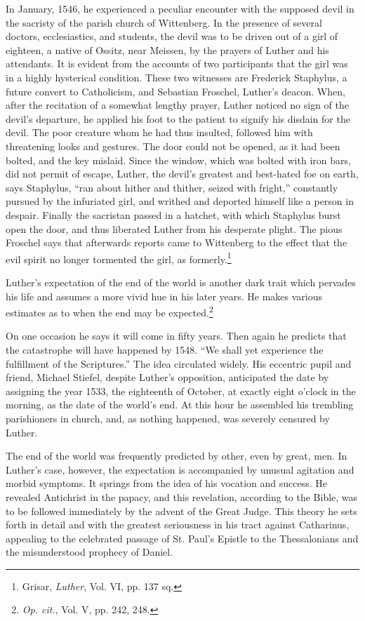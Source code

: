 In January, 1546, he experienced a peculiar encounter with the supposed
devil in the sacristy of the parish church of Wittenberg. In the presence of
several doctors, ecclesiastics, and students, the devil was to be driven out of
a girl of eighteen, a native of Ossitz, near Meissen, by the prayers of Luther
and his attendants. It is evident from the accounts of two participants that
the girl was in a highly hysterical condition. These two witnesses are
Frederick Staphylus, a future convert to Catholicism, and Sebastian Froschel,
Luther’s deacon. When, after the recitation of a somewhat lengthy prayer,
Luther noticed no sign of the devil’s departure, he applied his foot to the
patient to signify his disdain for the devil. The poor creature whom he had
thus insulted, followed him with threatening looks and gestures. The door
could not be opened, as it had been bolted, and the key mislaid. Since the
window, which was bolted with iron bars, did not permit of escape, Luther,
the devil’s greatest and best-hated foe on earth, says Staphylus, “ran about
hither and thither, seized with fright,” constantly pursued by the infuriated
girl, and writhed and deported himself like a person in despair. Finally the
sacristan passed in a hatchet, with which Staphylus burst open the door, and
thus liberated Luther from his desperate plight. The pious Froschel says that
afterwards reports came to Wittenberg to the effect that the evil spirit no
longer tormented the girl, as formerly.\footnote{Grisar, \textit{Luther}, Vol. VI, pp. 137 sq.}

Luther’s expectation of the end of the world is another dark trait
which pervades his life and assumes a more vivid hue in his later
years. He makes various estimates as to when the end may be expected.\footnote{\textit{Op. cit.}, Vol. V, pp. 242, 248.}

On one occasion he says it will come in fifty years. Then
again he predicts that the catastrophe will have happened by 1548.
“We shall yet experience the fulfillment of the Scriptures.” The idea
circulated widely. His eccentric pupil and friend, Michael Stiefel,
despite Luther’s opposition, anticipated the date by assigning the year
1533, the eighteenth of October, at exactly eight o’clock in the morning,
as the date of the world’s end. At this hour he assembled his trembling
parishioners in church, and, as nothing happened, was severely
censured by Luther.

The end of the world was frequently predicted by other, even by
great, men. In Luther’s case, however, the expectation is accompanied
by unusual agitation and morbid symptoms. It springs from the idea
of his vocation and success. He revealed Antichrist in the papacy, and
this revelation, according to the Bible, was to be followed immediately
by the advent of the Great Judge. This theory he sets forth in
detail and with the greatest seriousness in his tract against Catharinus,
appealing to the celebrated passage of St. Paul’s Epistle to the Thessalonians
and the misunderstood prophecy of Daniel.

